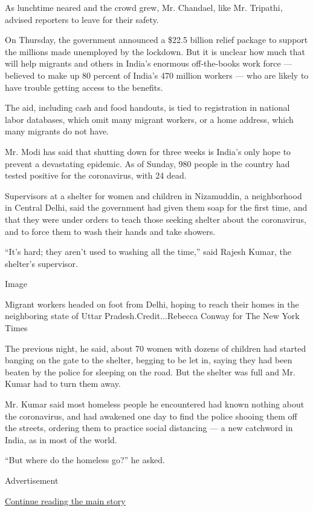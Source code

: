 As lunchtime neared and the crowd grew, Mr. Chandael, like Mr. Tripathi,
advised reporters to leave for their safety.

On Thursday, the government announced a \$22.5 billion relief package to
support the millions made unemployed by the lockdown. But it is unclear
how much that will help migrants and others in India's enormous
off-the-books work force --- believed to make up 80 percent of India's
470 million workers --- who are likely to have trouble getting access to
the benefits.

The aid, including cash and food handouts, is tied to registration in
national labor databases, which omit many migrant workers, or a home
address, which many migrants do not have.

Mr. Modi has said that shutting down for three weeks is India's only
hope to prevent a devastating epidemic. As of Sunday, 980 people in the
country had tested positive for the coronavirus, with 24 dead.

Supervisors at a shelter for women and children in Nizamuddin, a
neighborhood in Central Delhi, said the government had given them soap
for the first time, and that they were under orders to teach those
seeking shelter about the coronavirus, and to force them to wash their
hands and take showers.

``It's hard; they aren't used to washing all the time,'' said Rajesh
Kumar, the shelter's supervisor.

Image

Migrant workers headed on foot from Delhi, hoping to reach their homes
in the neighboring state of Uttar Pradesh.Credit...Rebecca Conway for
The New York Times

The previous night, he said, about 70 women with dozens of children had
started banging on the gate to the shelter, begging to be let in, saying
they had been beaten by the police for sleeping on the road. But the
shelter was full and Mr. Kumar had to turn them away.

Mr. Kumar said most homeless people he encountered had known nothing
about the coronavirus, and had awakened one day to find the police
shooing them off the streets, ordering them to practice social
distancing --- a new catchword in India, as in most of the world.

``But where do the homeless go?'' he asked.

Advertisement

\protect\hyperlink{after-bottom}{Continue reading the main story}

